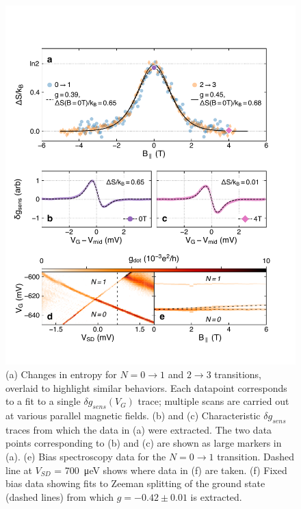 \documentclass[twocolumn,showpacs,amsmath,amssymb,prl,aps,superscriptaddress]{revtex4-1}
\begin{document}
\begin{figure}
        \includegraphics[width=1.0\columnwidth]{../figures/figure_3.pdf}
        \caption{\label{fig:fig3}(a) Changes in entropy for $N=0 \rightarrow 1$ and $2 \rightarrow 3$ transitions, overlaid to highlight similar behaviors.  Each datapoint corresponds to a fit to a single $\delta g_{sens}(V_G)$ trace; multiple scans are carried out at various parallel magnetic fields.   (b) and (c) Characteristic $\delta g_{sens}$ traces from which the data in (a) were extracted. The two data points corresponding to (b) and (c) are shown as large markers in (a). (e) Bias spectroscopy data for the $N=0 \rightarrow 1$ transition. Dashed line at $V_{SD}$ = \SI{700}{\micro\electronvolt} shows where data in (f) are taken. (f) Fixed bias data showing fits to Zeeman splitting of the ground state (dashed lines) from which $g = -0.42 \pm 0.01$ is extracted.}
\end{figure}
\end{document}
